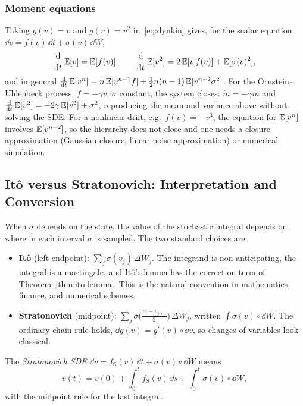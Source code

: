 \subsubsection*{Moment equations}

Taking $g(v)=v$ and $g(v)=v^2$ in~\eqref{eq:dynkin} gives, for the scalar equation $\dd v=f(v)\,\dd t+\sigma(v)\,\dd W$,
\begin{equation}
\label{eq:moment-equations}
\frac{\mathrm{d}}{\mathrm{d} t}\operatorname{\mathbb{E}}[v]=\operatorname{\mathbb{E}}[f(v)],\qquad
\frac{\mathrm{d}}{\mathrm{d} t}\operatorname{\mathbb{E}}[v^2]=2\operatorname{\mathbb{E}}[v\,f(v)]+\operatorname{\mathbb{E}}[\sigma(v)^2],
\end{equation}
and in general $\frac{\mathrm{d}}{\mathrm{d} t}\operatorname{\mathbb{E}}[v^n]=n\operatorname{\mathbb{E}}[v^{n-1}f]+\tfrac12n(n-1)\operatorname{\mathbb{E}}[v^{n-2}\sigma^2]$. For the Ornstein--Uhlenbeck process, $f=-\gamma v$, $\sigma$ constant, the system closes: $\dot m=-\gamma m$ and $\frac{\mathrm{d}}{\mathrm{d} t}\operatorname{\mathbb{E}}[v^2]=-2\gamma\operatorname{\mathbb{E}}[v^2]+\sigma^2$, reproducing the mean and variance above without solving the SDE. For a nonlinear drift, e.g.\ $f(v)=-v^3$, the equation for $\operatorname{\mathbb{E}}[v^n]$ involves $\operatorname{\mathbb{E}}[v^{n+2}]$, so the hierarchy does not close and one needs a closure approximation (Gaussian closure, linear-noise approximation) or numerical simulation.

\subsection{It\^o versus Stratonovich: Interpretation and Conversion}
\label{sec:ito-stratonovich}

When $\sigma$ depends on the state, the value of the stochastic integral depends on where in each interval $\sigma$ is sampled. The two standard choices are:
\begin{itemize}
\item \textbf{It\^o} (left endpoint): $\sum_j\sigma(v_j)\,\Delta W_j$. The integrand is non-anticipating, the integral is a martingale, and It\^o's lemma has the correction term of Theorem~\ref{thm:ito-lemma}. This is the natural convention in mathematics, finance, and numerical schemes.
\item \textbf{Stratonovich} (midpoint): $\sum_j\sigma\big(\tfrac{v_j+v_{j+1}}{2}\big)\,\Delta W_j$, written $\int\sigma(v)\circ\dd W$. The ordinary chain rule holds, $\dd g(v)=g'(v)\circ\dd v$, so changes of variables look classical.
\end{itemize}

\begin{definition}
\label{def:stratonovich}
The \emph{Stratonovich SDE} $\dd v=f_{\mathrm S}(v)\,\dd t+\sigma(v)\circ\dd W$ means
\[
v(t)=v(0)+\int_0^tf_{\mathrm S}(v)\,\dd s+\int_0^t\sigma(v)\circ\dd W,
\]
with the midpoint rule for the last integral.
\end{definition}

